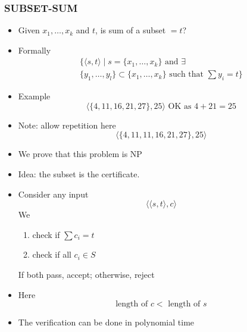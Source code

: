 \begin{frame}[allowframebreaks] \frametitle{SUBSET-SUM}
  \begin{itemize}
\item Given $x_1, \ldots, x_k$ and $t$, is sum of a subset $=t$?
\item Formally
  \begin{gather*}
   \{\langle  s,t\rangle 
\mid s=\{x_1, \ldots, x_k\}
\mbox{ and }
\exists \\
\{y_1, \ldots, y_l\}
\subset \{x_1, \ldots, x_k\} \text{ such that }
\sum y_i =t\}
\end{gather*}
\item Example
  \begin{equation*}
\langle  \{4,11,16,21,27\},25\rangle  \text{ OK as } 4+21=25
\end{equation*}
\item Note: allow repetition here
  \begin{equation*}
\langle  \{4,11,11,16,21,27\},25\rangle 
\end{equation*}
\item We prove that this problem is NP
\item Idea: the subset is the certificate.
\item Consider any input
  \begin{equation*}
  \langle  \langle  s,t\rangle ,c\rangle 
\end{equation*}
We 
  \begin{enumerate}
  \item check if $\sum c_i=t$
  \item check if all $c_i \in S$
  \end{enumerate}
If both pass, accept; otherwise, reject
\item Here
  \begin{equation*}
  \text{length of } c < \text{  length of } s
\end{equation*}
\item The verification can be done in polynomial time
\end{itemize}
\end{frame}




